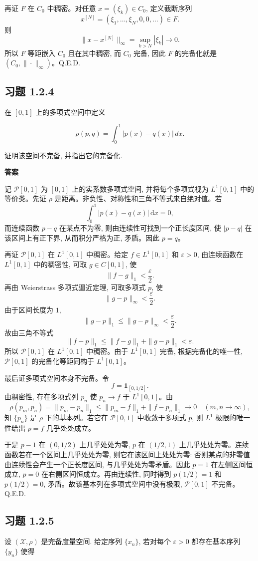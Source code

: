 \documentclass[UTF8,a4paper,11pt,fontset=fandol]{ctexart}
\newcommand{\exercise}[1]{\par\ifdim\dimexpr\pagegoal-\pagetotal\relax<7\baselineskip\newpage\fi\subsection*{习题 #1}}
\newcommand{\answer}{\par\smallskip\noindent\textbf{答案}\quad}
\newcommand{\qedherecustom}{\unskip\hfill\mbox{\normalfont Q.E.D.}\par}
\begin{document}
再证 $F$ 在 $C_0$ 中稠密。对任意 $x=(\xi_k)\in C_0$, 定义截断序列
\[
x^{[N]}=(\xi_1,\ldots,\xi_N,0,0,\ldots)\in F.
\]
则
\[
\|x-x^{[N]}\|_\infty=\sup_{k>N}|\xi_k|\longrightarrow0.
\]
所以 $F$ 等距嵌入 $C_0$ 且在其中稠密, 而 $C_0$ 完备, 因此 $F$ 的完备化就是 $(C_0,\|\cdot\|_\infty)$。\qedherecustom

\exercise{1.2.4}

在 $[0,1]$ 上的多项式空间中定义

\[
\rho(p,q)=\int_0^1|p(x)-q(x)|\,dx.
\]

证明该空间不完备, 并指出它的完备化.

\answer

记 $\mathcal P[0,1]$ 为 $[0,1]$ 上的实系数多项式空间, 并将每个多项式视为 $L^1[0,1]$ 中的等价类。先证 $\rho$ 是距离。非负性、对称性和三角不等式来自绝对值。若
\[
\int_0^1|p(x)-q(x)|\,\mathrm dx=0,
\]
而连续函数 $p-q$ 在某点不为零, 则由连续性可找到一个正长度区间, 使 $|p-q|$ 在该区间上有正下界, 从而积分严格为正, 矛盾。因此 $p=q$。

再证 $\mathcal P[0,1]$ 在 $L^1[0,1]$ 中稠密。给定 $f\in L^1[0,1]$ 和 $\varepsilon>0$, 由连续函数在 $L^1[0,1]$ 中的稠密性, 可取 $g\in C[0,1]$, 使
\[
\|f-g\|_1<\frac\varepsilon2.
\]
再由 Weierstrass 多项式逼近定理, 可取多项式 $p$, 使
\[
\|g-p\|_\infty<\frac\varepsilon2.
\]
由于区间长度为 $1$,
\[
\|g-p\|_1\leq\|g-p\|_\infty<\frac\varepsilon2.
\]
故由三角不等式
\[
\|f-p\|_1\leq\|f-g\|_1+\|g-p\|_1<\varepsilon.
\]
所以 $\mathcal P[0,1]$ 在 $L^1[0,1]$ 中稠密。由于 $L^1[0,1]$ 完备, 根据完备化的唯一性, $\mathcal P[0,1]$ 的完备化等距同构于 $L^1[0,1]$。

最后证多项式空间本身不完备。令
\[
f=\mathbf 1_{[0,1/2]}.
\]
由稠密性, 存在多项式列 $p_n$ 使 $p_n\to f$ 于 $L^1[0,1]$。由
\[
\rho(p_m,p_n)=\|p_m-p_n\|_1
\leq\|p_m-f\|_1+\|f-p_n\|_1\longrightarrow0
\quad(m,n\to\infty),
\]
知 $\{p_n\}$ 是 $\rho$ 下的基本列。若它在 $\mathcal P[0,1]$ 中收敛于多项式 $p$, 则 $L^1$ 极限的唯一性给出 $p=f$ 几乎处处成立。

于是 $p-1$ 在 $(0,1/2)$ 上几乎处处为零, $p$ 在 $(1/2,1)$ 上几乎处处为零。连续函数若在一个区间上几乎处处为零, 则它在该区间上处处为零: 否则某点的非零值由连续性会产生一个正长度区间, 与几乎处处为零矛盾。因此 $p=1$ 在左侧区间恒成立, $p=0$ 在右侧区间恒成立。再由连续性, 同时得到 $p(1/2)=1$ 和 $p(1/2)=0$, 矛盾。故该基本列在多项式空间中没有极限, $\mathcal P[0,1]$ 不完备。\qedherecustom

\exercise{1.2.5}

设 $(\mathcal X,\rho)$ 是完备度量空间. 给定序列 $\{x_n\}$, 若对每个 $\varepsilon>0$ 都存在基本序列 $\{y_n\}$ 使得
\end{document}
